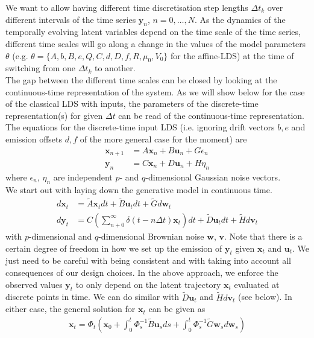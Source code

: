 \documentclass[10pt,letterpaper]{article}
\newcommand{\xb}{\mathbf{x}}
\newcommand{\ub}{\mathbf{u}}
\newcommand{\wb}{\mathbf{w}}
\newcommand{\yb}{\mathbf{y}}
\newcommand{\vb}{\mathbf{v}}
\begin{document}
\noindent{}We want to allow having different time discretisation step lengths $\Delta{}t_k$ over different intervals of the time series $\yb_n$, $n = 0, \ldots, N$. 
As the dynamics of the temporally evolving latent variables depend on the time scale of the time series, different time scales will go along a change in the values of the model parameters $\theta$ (e.g. $\theta = \{A,b,B,e,Q,C,d,D,f,R, \mu_0, V_0 \}$ for the affine-LDS) at the time of switching from one $\Delta{}t_k$ to another. \\
\noindent{}The gap between the different time scales can be closed by looking at the continuous-time representation of the system. 
As we will show below for the case of the classical LDS with inputs, the parameters of the discrete-time representation(s) for given $\Delta{}t$ can be read of the continuous-time representation. \\
The equations for the discrete-time input LDS (i.e. ignoring drift vectors $b,e$ and emission offsets $d,f$ of the more general case for the moment) are 
\begin{align}
\xb_{n+1} &= A \xb_n + B \ub_n + G \epsilon_n 
\label{eq:inputLDS_discTime} \\
\yb_{n} &= C \xb_n  + D \ub_n + H \eta_n
\end{align}
where $\epsilon_n$, $\eta_n$ are independent $p$- and $q$-dimensional Gaussian noise vectors. \\
\noindent{}We start out with laying down the generative model in continuous time. 
\begin{align}
d{\xb_t} &= \tilde{A} \xb_t dt + \tilde{B} \ub_t dt + \tilde{G} d\wb_t
\label{eq:inputLDS_contTime} \\
d{\yb_t} &= C \left( \sum_{n+0}^\infty \delta{}(t - n\Delta{}t) \xb_t \right) dt + \tilde{D} \ub_t dt + \tilde{H} d\vb_t  
\end{align}
with $p$-dimensional and $q$-dimensional Brownian noise $\wb$, $\vb$. Note that there is a certain degree of freedom in how we set up the emission of $\yb_t$ given $\xb_t$ and $\ub_t$. We just need to be careful with being consistent and with taking into account all consequences of our design choices. In the above approach, we enforce the observed values $\yb_t$ to only depend on the latent trajectory $\xb_t$ evaluated at discrete points in time. We can do similar with $\tilde{D}\ub_t$ and $\tilde{H}d\vb_t$ (see below). In either case, the general solution for $\xb_t$ can be given as
\begin{align}
\xb_t = \Phi_t \left( \xb_0 + \int_0^t \Phi_s^{-1} \tilde{B} \ub_s ds + \int_0^t \Phi_s^{-1} \tilde{G} \wb_s d\wb_s \right) \label{eq:inputLDS_contTime_solution} 
\end{align}
\end{document}
